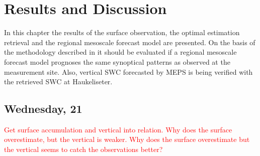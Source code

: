 \chapter{Results and Discussion} \label{ch:Res}
%
In this chapter the results of the surface observation, the optimal estimation retrieval and the regional mesoscale forecast model are presented. On the basis of the methodology described in  it should be evaluated if a regional mesoscale forecast model prognoses the same synoptical patterns as observed at the measurement site. Also, vertical SWC forecasted by MEPS is being verified with the retrieved SWC at Haukeliseter. 











%
%
%
%

\section{Wednesday, \SI{21}{\dec}}
\textcolor{red}{Get surface accumulation and vertical into relation. Why does the surface overestimate, but the vertical is weaker. Why does the surface overestimate but the vertical seems to catch the observations better?}
